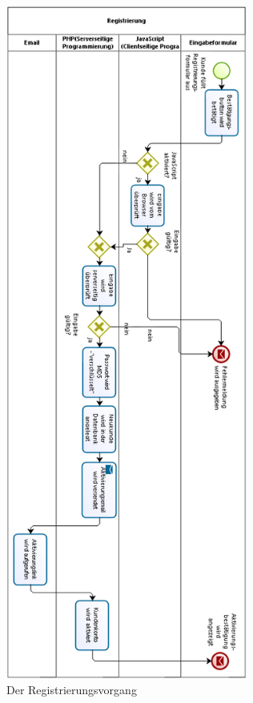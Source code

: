 \begin{figure}[H]
	\begin{center}
			\includegraphics[width=225pt]{Bilder/Abbildung13_Reg_Vorgang.png}
	\end{center}
	\caption{Der Registrierungsvorgang}
	\label{fig:Abbildung 13}
\end{figure}


